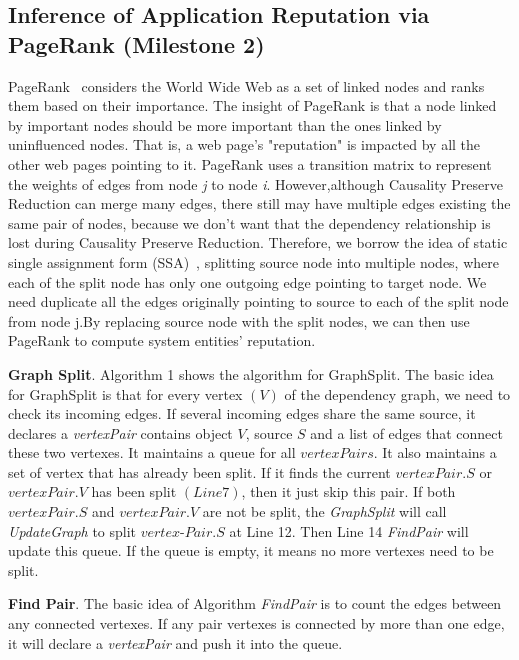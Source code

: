\subsection{Inference of Application Reputation via\\PageRank (Milestone 2)}

PageRank~\cite{pagerank} considers the World Wide Web as a set of linked nodes and ranks them based on their importance. The insight of PageRank is that a node linked by important nodes should be more important than the ones linked by uninfluenced nodes. That is, a web page's "reputation" is impacted by all the other web pages pointing to it. PageRank uses a transition matrix to represent the weights of edges from node \textit{j} to node \textit{i}. However,although Causality Preserve Reduction can merge many edges, there still may have multiple edges existing the same pair of nodes, because we don't want that the dependency relationship is lost during Causality Preserve Reduction. Therefore, we borrow the idea of static single assignment form (SSA)~\cite{nielson2004principles}, splitting source node  into multiple nodes, where each of the split node has only one outgoing edge pointing to target node. We need duplicate all the edges originally pointing to source to each of the split node from node j.By replacing source node with the split nodes, we can then use PageRank to compute system entities' reputation.

\textbf{Graph Split}.
Algorithm 1 shows the algorithm for GraphSplit. 
The basic idea for GraphSplit is that for every vertex $(V)$ of the dependency graph, we need to check its incoming edges. If several incoming edges share the same source, it declares a \textit{vertexPair} contains object $V$, source $S$ and a list of edges that connect these two vertexes. It maintains a queue for all $vertexPairs$. It also maintains a set of vertex that has already been split. If it finds the current $vertexPair.S$ or $vertexPair.V$ has been split $(Line 7)$, then it just skip this pair. If both  $vertexPair.S$ and $vertexPair.V$  are not be split, the \textit{GraphSplit} will call \textit{UpdateGraph} to split $vertex$-$Pair.S$ at Line 12. Then Line 14 \textit{FindPair} will update this queue. If the queue is empty, it means no more vertexes need to be split.

\textbf{Find Pair}.
The basic idea of Algorithm \textit{FindPair} is to count the edges between any connected vertexes. If any pair vertexes is connected by more than one edge, it will declare a \textit{vertexPair} and push it into the queue. 

